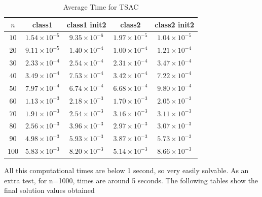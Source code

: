 \documentclass[a4paper, 11pt]{article}
\begin{document}
		
	\begin{table}[H]
		\centering
		\begin{tabular}{c|c|c|c|c}
			\textbf{$ n $} 	& \textbf{class1} & \textbf{class1 init2}  & \textbf{class2} & \textbf{class2 init2}  \\ \hline
			$ 10  $			& $1.54\times10^{-5}$ & $9.35\times10^{-6}$& $1.97\times10^{-5}$ & $1.04\times10^{-5}$ \\ \hline
			$ 20  $			& $9.11\times10^{-5}$ & $1.40\times10^{-4}$& $1.00\times10^{-4}$ & $1.21\times10^{-4}$ \\ \hline
			$ 30  $			& $2.33\times10^{-4}$ & $2.54\times10^{-4}$& $2.31\times10^{-4}$ & $3.47\times10^{-4}$ \\ \hline
			$ 40  $			& $3.49\times10^{-4}$ & $7.53\times10^{-4}$& $3.42\times10^{-4}$ & $7.22\times10^{-4}$\\ \hline
			$ 50  $			& $7.97\times10^{-4}$ & $6.74\times10^{-4}$& $6.68\times10^{-4}$ & $9.80\times10^{-4}$ \\ \hline
			$ 60  $			& $1.13\times10^{-3}$ & $2.18\times10^{-3}$& $1.70\times10^{-3}$ & $2.05\times10^{-3}$ \\ \hline
			$ 70 $			& $1.91\times10^{-3}$ & $2.54\times10^{-3}$& $3.16\times10^{-3}$ & $3.11\times10^{-3}$\\ \hline
			$ 80 $			& $2.56\times10^{-3}$ & $3.96\times10^{-3}$& $2.97\times10^{-3}$ & $3.07\times10^{-3}$\\ \hline
			$ 90 $			& $4.98\times10^{-3}$ & $5.93\times10^{-3}$& $3.87\times10^{-3}$ & $5.73\times10^{-3}$\\ \hline
			$ 100 $			& $5.83\times10^{-3}$ & $8.20\times10^{-3}$& $5.14\times10^{-3}$ & $8.66\times10^{-3}$\\
		\end{tabular}
		\caption{Average Time for TSAC}
		\label{table:times2}
	\end{table}

	All this computational times are below 1 second, so very easily solvable.
	As an extra test, for n=1000, times are around 5 seconds.
	The following tables show the final solution values obtained
\end{document}
